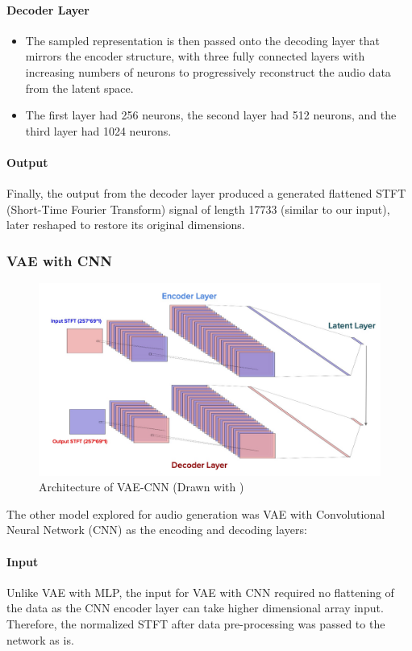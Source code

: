 \documentclass[12pt]{article}
\begin{document}
\paragraph{Decoder Layer}
\begin{itemize}
    \item The sampled representation is then passed onto the decoding layer that mirrors the encoder structure, with three fully connected layers with increasing numbers of neurons to progressively reconstruct the audio data from the latent space.
    \item The first layer had 256 neurons, the second layer had 512 neurons, and the third layer had 1024 neurons.
\end{itemize}

\paragraph{Output}
Finally, the output from the decoder layer produced a generated flattened STFT (Short-Time Fourier Transform) signal of length 17733 (similar to our input), later reshaped to restore its original dimensions.

\subsubsection{VAE with CNN}
\begin{figure}[!h]
    \centering
    \includegraphics[width=1\linewidth]{figures/VAE-CNN.jpg}
    \caption{Architecture of VAE-CNN (Drawn with \cite{LeNail2019})}
    \label{fig:enter-label}
\end{figure}
The other model explored for audio generation was VAE with Convolutional Neural Network (CNN) as the encoding and decoding layers:

\paragraph{Input}
Unlike VAE with MLP, the input for VAE with CNN required no flattening of the data as the CNN encoder layer can take higher dimensional array input. Therefore, the normalized STFT after data pre-processing was passed to the network as is.
\end{document}
